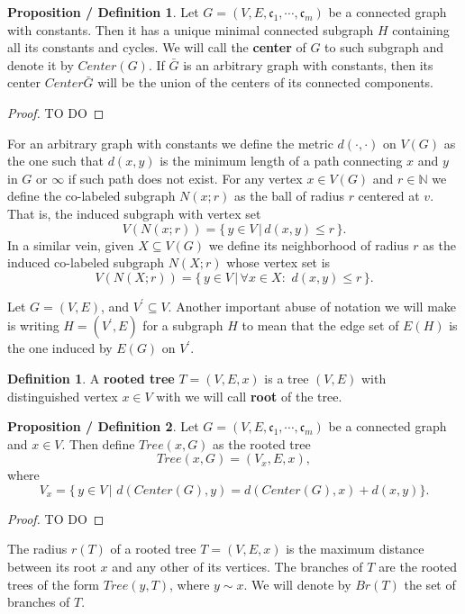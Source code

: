 \documentclass[11pt,notitlepage]{report}
\theoremstyle{definition}
\newtheorem{definition}{Definition}[chapter]
\newtheorem{propdef}{Proposition / Definition}[chapter]
\newcommand{\N}{\mathbb{N}}
\newcommand{\clist}{\mathfrak{c}_{1}, \cdots, \mathfrak{c}_m}
\begin{document}
\begin{propdef}
	Let $G=(V,E,\clist)$ be a connected graph with constants. Then it has a unique minimal
	connected subgraph $H$ containing all its constants and cycles.
	We will call the \textbf{center} of $G$ to such subgraph and denote it by $Center(G)$.
	If $\bar{G}$ is an arbitrary graph with constants, then its center $Center{\bar{G}}$ will
	be the union of the centers of its connected components. 
\end{propdef}
\begin{proof}
	TO DO
\end{proof}

For an arbitrary graph with constants we define the metric $d(\cdot,\cdot)$ on $V(G)$ 
as the one such that $d(x,y)$ is the minimum length of a path connecting
$x$ and $y$ in $G$ or $\infty$ if such path does not exist. 
For any vertex $x\in V(G)$ and $r\in \N$ we define the co-labeled
subgraph $N(x;r)$ as the ball of radius $r$ centered at $v$. 
That is, the induced subgraph with vertex set
\[ V(N(x;r))= \{\, y\in V \, | \, d(x,y)\leq  r \,	\}.\] 
In a similar vein, given $X\subseteq V(G)$ we define its neighborhood of radius $r$ as
the induced co-labeled subgraph $N(X;r)$ whose vertex set is
\[ V(N(X;r))= \{\, y\in V \, | \, \forall x\in X: \, \,  d(x,y)\leq  r \,	\}.\]  
\par

Let $G=(V,E)$, and $V^\prime\subseteq V$. Another important abuse 
of notation we will make is writing $H=(V^\prime, E)$ 
for a subgraph $H$ to mean that the edge set of $E(H)$ is the one
induced by $E(G)$ on $V^\prime$.

\begin{definition} 
	A \textbf{rooted tree} $T=(V,E,x)$ is a tree 
	$(V,E)$ with distinguished vertex $x\in V$ with we will call 
	\textbf{root} of the tree.
\end{definition}

\begin{propdef}
	Let $G=(V,E,\clist)$ be a connected graph and $x\in V$. 
	Then define $Tree(x,G)$	as the rooted tree
	\[Tree(x,G) = (V_x,E,x),\] where
	\[V_x= \{\, y\in V \, | \,\,d(Center(G),y) = d(Center(G),x) + d(x,y) \}.\]

\end{propdef}
\begin{proof}
	TO DO
\end{proof}



The radius $r(T)$ of a rooted tree $T=(V,E,x)$
is the maximum distance between its root $x$ and any other of
its vertices. The branches of $T$ are the rooted trees of the form
$Tree(y,T)$, where $y\sim x$. We will denote by $Br(T)$ the set of
branches of $T$. \par
\end{document}
